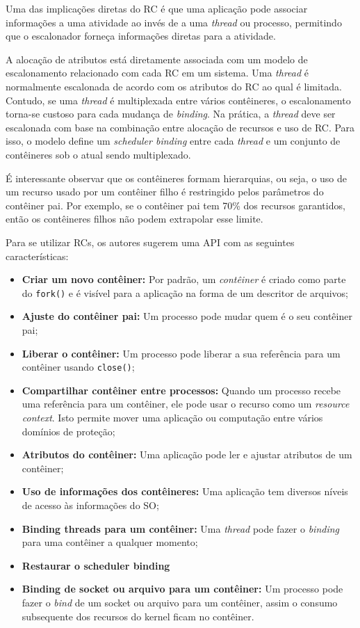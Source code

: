 Uma das implicações diretas do RC é que uma aplicação pode associar informações a
uma atividade ao invés de a uma \emph{thread} ou processo, permitindo que
o escalonador forneça informações diretas para a atividade.

A alocação de atributos está diretamente associada com um modelo de
escalonamento relacionado com cada RC em um sistema. Uma \emph{thread} é normalmente
escalonada de acordo com os atributos do RC ao qual é limitada. Contudo, se uma
\emph{thread} é multiplexada entre vários contêineres, o escalonamento torna-se custoso
para cada mudança de \textit{binding}. Na prática, a \emph{thread} deve ser escalonada com base
na combinação entre alocação de recursos e uso de RC. Para isso, o modelo
define um \emph{scheduler binding} entre cada \emph{thread} e um conjunto de contêineres
sob o atual sendo multiplexado. 

É interessante observar que os contêineres formam hierarquias, ou seja, o uso de
um recurso usado por um contêiner filho é restringido pelos parâmetros do
contêiner pai. Por exemplo, se o contêiner pai tem 70\% dos recursos
garantidos, então os contêineres filhos não podem extrapolar esse limite.

Para se utilizar RCs, os autores sugerem uma API com as seguintes
características:

\begin{itemize}
	\item \textbf{Criar um novo contêiner:} Por padrão, um \emph{contêiner} é criado
				como parte do \texttt{fork()} e é visível para a aplicação na forma
				de um descritor de arquivos;
	\item \textbf{Ajuste do contêiner pai:} Um processo pode mudar quem é o seu
				contêiner pai;
	\item \textbf{Liberar o contêiner:} Um processo pode liberar a sua referência
				para um contêiner usando \texttt{close()};
	\item \textbf{Compartilhar contêiner entre processos:} Quando um processo
				recebe uma referência para um contêiner, ele pode usar o recurso como
				um \emph{resource context}. Isto permite mover uma aplicação ou
				computação entre vários domínios de proteção;
	\item \textbf{Atributos do contêiner:} Uma aplicação pode ler e ajustar
				atributos de um contêiner;
	\item \textbf{Uso de informações dos contêineres:} Uma aplicação tem diversos
        níveis de acesso às informações do SO;
	\item \textbf{Binding threads para um contêiner:} Uma \emph{thread} pode fazer o
		\emph{binding} para uma contêiner a qualquer momento;
	\item \textbf{Restaurar o scheduler binding}
	\item \textbf{Binding de socket ou arquivo para um contêiner:} Um processo
				pode fazer o \emph{bind} de um socket ou arquivo para um contêiner,
				assim o consumo subsequente dos recursos do kernel ficam no contêiner.
\end{itemize}

